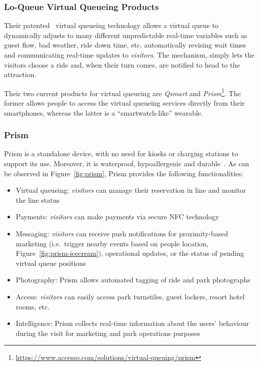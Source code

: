 \subsubsection{Lo-Queue Virtual Queueing Products}
Their patented~\cite{q-management-system-patent} %
virtual queueing technology allows a virtual queue to dynamically adjusts to many different unpredictable real-time variables such
as guest flow, bad weather, ride down time, etc.
automatically revising wait times and communicating real-time updates to \textit{visitors}.
The mechanism, simply lets the visitors choose a ride and, when their turn comes, are notified to head to the attraction.

Their two current products for virtual queueing are \textit{Qsmart} and \textit{Prism}\footnote{\url{https://www.accesso.com/solutions/virtual-queuing/prism}}.
The former allows people to access the virtual queueing services directly from their smartphones, whereas the latter is a ``smartwatch-like''
wearable.

\subsubsection*{Prism}
Prism is a standalone device, with no need for kiosks or charging stations to support its use.
Moreover, it is waterproof, hypoallergenic and durable~\cite{prism-desc}.
As can be observed in Figure~\ref{fig:prism}, Prism provides the following functionalities:
\begin{itemize}
    \item Virtual queueing: \textit{visitors} can manage their reservation in line and monitor the line status
    \item Payments: \textit{visitors} can make payments via secure NFC technology
    \item Messaging: \textit{visitors} can receive push notifications for proximity-based marketing (i.e.\ trigger nearby events based on people location, Figure~\ref{fig:prism-icecream}), operational updates, or the status of pending virtual queue positions
    \item Photography: Prism allows automated tagging of ride and park photographs
    \item Access: \textit{visitors} can easily access park turnstiles, guest lockers, resort hotel rooms, etc.
    \item Intelligence: Prism collects real-time information about the users' behaviour during the visit for marketing and park operations purposes
\end{itemize}

